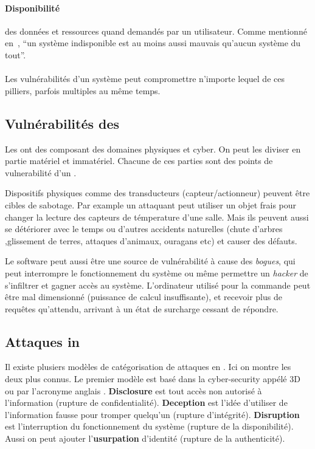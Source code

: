 \documentclass[../main.tex]{subfiles}
\begin{document}
\paragraph{Disponibilité} des données et ressources quand demandés par un utilisateur.
Comme mentionné en~\cite{Bishop2005}, ``un système indisponible est au moins aussi mauvais qu'aucun système du tout''.
\\~\\
Les vulnérabilités d'un système peut compromettre n'importe lequel de ces pilliers, parfois multiples au même temps.
\subsection{Vulnérabilités des \cps{}}

Les \cps{} ont des composant des domaines physiques et cyber.
On peut les diviser en partie matériel et immatériel.
Chacune de ces parties sont des points de vulnerabilité d'un \cps{}.

Dispositifs physiques comme des transducteurs (capteur/actionneur) peuvent être cibles de sabotage. Par example un attaquant peut utiliser un objet frais pour changer la lecture des capteurs de témperature d'une salle. Mais ils peuvent aussi se détériorer avec le temps ou d'autres accidents naturelles (chute d'arbres ,glissement de terres, attaques d'animaux, ouragans etc) et causer des défauts.

Le software peut aussi être une source de vulnérabilité à cause des \emph{bogues}, qui peut interrompre le fonctionnement du système ou même permettre un \emph{hacker} de s'infiltrer et gagner accès au système.
L'ordinateur utilisé pour la commande peut être mal dimensionné (puissance de calcul insuffisante), et recevoir plus de requêtes qu'attendu, arrivant à un état de surcharge cessant de répondre.


\subsection{Attaques in \cps{}}\label{sec:attacks_fr}

Il existe plusiers modèles de catégorisation de attaques en \cps{}.
Ici on montre les deux plus connus.
Le premier modèle est basé dans la cyber-security appélé 3D ou \DDDshort par l'acronyme anglais \DDD.
\textbf{Disclosure} est tout accès non autorisé à l'information (rupture de confidentialité).
\textbf{Deception} est l'idée d'utiliser de l'information fausse pour tromper quelqu'un (rupture d'intégrité).
\textbf{Disruption} est l'interruption du fonctionnement du système (rupture de la disponibilité). Aussi on peut ajouter l'\textbf{usurpation} d'identité (rupture de la authenticité).
\end{document}
